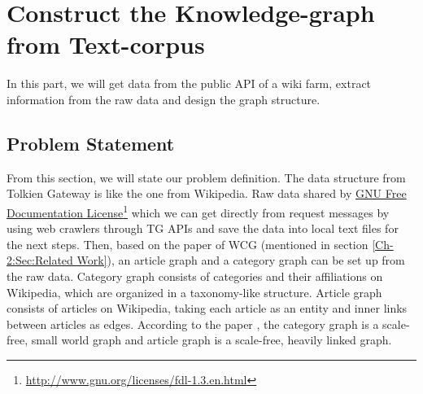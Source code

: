 \chapter{Construct the Knowledge-graph from Text-corpus}
\label{Ch-2:Sec:Standardize}

In this part, we will get data from the public API of a wiki farm, extract information from the raw data and design the graph structure.

\section{Problem Statement}
\label{Ch-2:Sec:Problem Statement}
\vspace{-5pt}	
From this section, we will state our problem definition. The data structure from Tolkien Gateway is like the one from Wikipedia. Raw data shared by \href{http://www.gnu.org/licenses/fdl-1.3.en.html}{GNU Free Documentation License}\footnote{\href{http://www.gnu.org/licenses/fdl-1.3.en.html}{http://www.gnu.org/licenses/fdl-1.3.en.html}} which we can get directly from request messages by using web crawlers through TG APIs and save the data into local text files for the next steps. Then, based on the paper of WCG \cite{zesch2007analysis} (mentioned in section \ref{Ch-2:Sec:Related Work}), an article graph and a category graph can be set up from the raw data. Category graph consists of categories and their affiliations on Wikipedia, which are organized in a taxonomy-like structure. Article graph consists of articles on Wikipedia, taking each article as an entity and inner links between articles as edges. According to the paper \cite{zesch2007analysis}, the category graph is a scale-free, small world graph and article graph is a scale-free, heavily linked graph.\\
